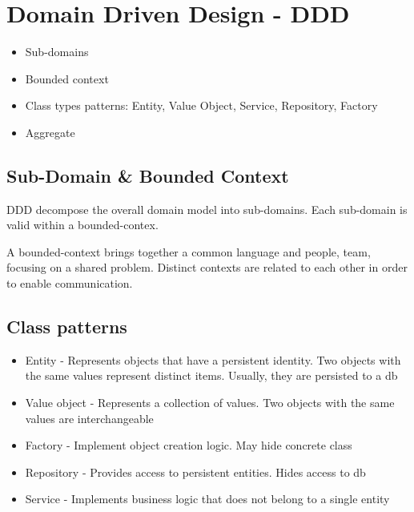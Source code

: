\section{Domain Driven Design - DDD}


\begin{itemize}
  \item Sub-domains
  \item Bounded context
  \item Class types patterns: Entity, Value Object, Service, Repository, Factory
  \item Aggregate
\end{itemize}

\subsection{Sub-Domain \& Bounded Context}
DDD decompose the overall domain
model into sub-domains. Each sub-domain is valid within a
bounded-contex.


A bounded-context brings together a common language and people, team, focusing on a shared problem.
Distinct contexts are related to each
other in order to enable communication.

\subsection{Class patterns}

\begin{itemize}
  \item Entity - Represents objects that have a persistent identity. Two
        objects with the same values represent distinct items. Usually, they are
        persisted to a db
  \item Value object - Represents a collection of values. Two objects with the same values are
        interchangeable
  \item Factory - Implement object creation logic. May hide concrete class
  \item Repository - Provides access to persistent entities. Hides access to db
  \item Service - Implements business logic that does not belong to a single entity
\end{itemize}



